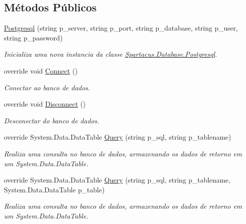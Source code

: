 \subsection*{Métodos Públicos}
\begin{DoxyCompactItemize}
\item 
\hyperlink{classSpartacus_1_1Database_1_1Postgresql_aa31cf4130a7a47488de77d9c8152c90c}{Postgresql} (string p\+\_\+server, string p\+\_\+port, string p\+\_\+database, string p\+\_\+user, string p\+\_\+password)
\begin{DoxyCompactList}\small\item\em Inicializa uma nova instancia da classe \hyperlink{classSpartacus_1_1Database_1_1Postgresql}{Spartacus.\+Database.\+Postgresql}. \end{DoxyCompactList}\item 
override void \hyperlink{classSpartacus_1_1Database_1_1Postgresql_a5472d5419eedb90b314ae10f933c6ca8}{Connect} ()
\begin{DoxyCompactList}\small\item\em Conectar ao banco de dados. \end{DoxyCompactList}\item 
override void \hyperlink{classSpartacus_1_1Database_1_1Postgresql_a6d1e4775329c28979da558ad4c4c99d5}{Disconnect} ()
\begin{DoxyCompactList}\small\item\em Desconectar do banco de dados. \end{DoxyCompactList}\item 
override System.\+Data.\+Data\+Table \hyperlink{classSpartacus_1_1Database_1_1Postgresql_a4a60b1e3851bb0b9bec5ad3d8b6bdc4e}{Query} (string p\+\_\+sql, string p\+\_\+tablename)
\begin{DoxyCompactList}\small\item\em Realiza uma consulta no banco de dados, armazenando os dados de retorno em um System.\+Data.\+Data\+Table. \end{DoxyCompactList}\item 
override System.\+Data.\+Data\+Table \hyperlink{classSpartacus_1_1Database_1_1Postgresql_ad14dbb0c81571d02b368388d8a8ebd97}{Query} (string p\+\_\+sql, string p\+\_\+tablename, System.\+Data.\+Data\+Table p\+\_\+table)
\begin{DoxyCompactList}\small\item\em Realiza uma consulta no banco de dados, armazenando os dados de retorno em um System.\+Data.\+Data\+Table. \end{DoxyCompactList}\item 

\end{DoxyCompactItemize}
